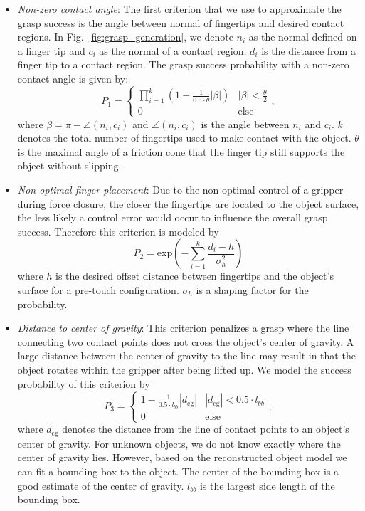 \begin{itemize}
\item \textit{Non-zero contact angle}: 
 The first criterion that we use to approximate the grasp success is the angle between normal of fingertips and desired contact regions. In Fig.~\ref{fig:grasp_generation}, we denote $n_i$ as the normal defined on a finger tip and $c_i$ as the normal of a contact region. $d_i$ is the distance from a finger tip to a contact region. The grasp success probability with a non-zero contact angle is given by:
\begin{equation}
P_1 = \begin{cases}
\prod_{i=1}^{k}(1 -\frac{1}{0.5\cdot \theta} |\beta|)   & |\beta | < \frac{\theta}{2}\\
  0   & \text{else}
\end{cases},
\end{equation} 
where $\beta = \pi - \angle(n_i,c_i)$ and $\angle(n_i,c_i)$ is the angle between $n_i$ and $c_i$.  $k$ denotes the total number of fingertips used to make contact with the object. $\theta$ is the maximal angle of a friction cone that the finger tip still supports the object without slipping. 
\item \textit{Non-optimal finger placement}:
Due to the non-optimal control of a gripper during force closure, the closer the fingertips are located to the object surface, the less likely a control error would occur to influence the overall grasp success. Therefore this criterion is modeled by 
\begin{equation} 
P_2 = \text{exp}\left(-\sum_{i=1}^k \frac{d_i-h}{\sigma_h^2}\right)
\end{equation}
where $h$ is the desired offset distance between fingertips and the object's surface for a pre-touch configuration. $\sigma_h$ is a shaping factor for the probability. 

\item \textit{Distance to center of gravity}:
This criterion penalizes a grasp where the line connecting two contact points does not cross the object's center of gravity. A large distance between the center of gravity to the line may result in that the object rotates within the gripper after being lifted up.  We model the success probability of this criterion by 
\begin{equation} 
P_3 = \begin{cases}
  1 -\frac{1}{ 0.5\cdot l_{bb} } |d_{\text{cg}}|      &  |d_{\text{cg}}|   < 0.5 \cdot l_{bb}  \\
  0   & \text{else}
\end{cases},
\end{equation}
where $d_{\text{cg}}$ denotes the distance from the line of contact points to an object's center of gravity. For unknown objects, we do not know  exactly where the center of gravity lies. However, based on the reconstructed object model we can fit a bounding box to the object. The center of the bounding box is a good estimate of the center of gravity. $l_{bb}$ is the largest side length of the bounding box. 


\end{itemize}

